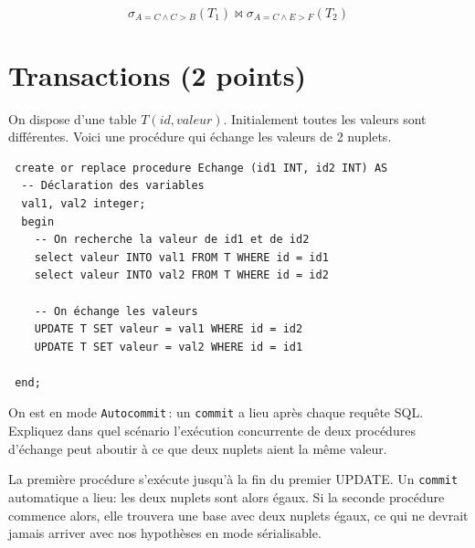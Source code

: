 \begin{solution}
$$\sigma_{A=C \land C > B} (T_1) \Join \sigma_{A=C \land E > F}(T_2)$$
\end{solution}

\section{Transactions (2 points)}

On dispose d'une table $T (id, valeur)$. Initialement toutes les valeurs sont différentes. 
Voici une procédure qui échange les valeurs de 2 nuplets.

\begin{verbatim}
 create or replace procedure Echange (id1 INT, id2 INT) AS
  -- Déclaration des variables
  val1, val2 integer;
  begin
    -- On recherche la valeur de id1 et de id2
    select valeur INTO val1 FROM T WHERE id = id1
    select valeur INTO val2 FROM T WHERE id = id2

    -- On échange les valeurs
    UPDATE T SET valeur = val1 WHERE id = id2
    UPDATE T SET valeur = val2 WHERE id = id1

 end;
\end{verbatim}

On est en mode \texttt{Autocommit}\,: un \texttt{commit} a lieu après chaque requête SQL. Expliquez
dans quel scénario l'exécution concurrente de deux procédures d'échange peut aboutir
à ce que deux nuplets aient la même valeur.


\begin{solution}
La première procédure s'exécute jusqu'à la fin du premier UPDATE. Un \texttt{commit} automatique
a lieu: les deux nuplets sont alors égaux. Si la seconde procédure commence alors, elle trouvera
une base avec deux nuplets égaux, ce qui ne devrait jamais arriver avec nos hypothèses en mode sérialisable.
\end{solution}



